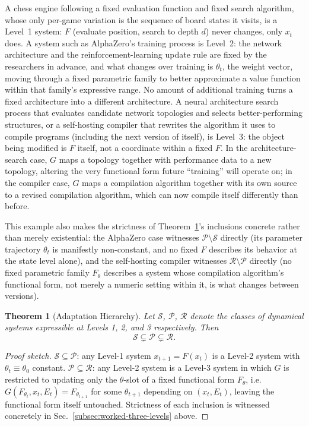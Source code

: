 \documentclass[12pt,a4paper]{article}
\theoremstyle{plain}
\newtheorem{theorem}{Theorem}[section]
\theoremstyle{definition}
\theoremstyle{remark}
\begin{document}
A chess engine following a fixed evaluation function and fixed search algorithm, whose only per-game variation is the sequence of board states it visits, is a Level~1 system: $F$ (evaluate position, search to depth $d$) never changes, only $x_t$ does. A system such as AlphaZero's training process is Level~2: the network architecture and the reinforcement-learning update rule are fixed by the researchers in advance, and what changes over training is $\theta_t$, the weight vector, moving through a fixed parametric family to better approximate a value function within that family's expressive range. No amount of additional training turns a fixed architecture into a different architecture. A neural architecture search process that evaluates candidate network topologies and selects better-performing structures, or a self-hosting compiler that rewrites the algorithm it uses to compile programs (including the next version of itself), is Level~3: the object being modified is $F$ itself, not a coordinate within a fixed $F$. In the architecture-search case, $G$ maps a topology together with performance data to a new topology, altering the very functional form future ``training'' will operate on; in the compiler case, $G$ maps a compilation algorithm together with its own source to a revised compilation algorithm, which can now compile itself differently than before.

This example also makes the strictness of Theorem~\ref{thm:adaptation-hierarchy}'s inclusions concrete rather than merely existential: the AlphaZero case witnesses $\mathcal{P}\setminus\mathcal{S}$ directly (its parameter trajectory $\theta_t$ is manifestly non-constant, and no fixed $F$ describes its behavior at the state level alone), and the self-hosting compiler witnesses $\mathcal{R}\setminus\mathcal{P}$ directly (no fixed parametric family $F_\theta$ describes a system whose compilation algorithm's functional form, not merely a numeric setting within it, is what changes between versions).

\begin{theorem}[Adaptation Hierarchy]
\label{thm:adaptation-hierarchy}
Let $\mathcal{S}$, $\mathcal{P}$, $\mathcal{R}$ denote the classes of dynamical systems expressible at Levels 1, 2, and 3 respectively. Then
\[
\mathcal{S} \subsetneq \mathcal{P} \subsetneq \mathcal{R}.
\]
\end{theorem}

\begin{proof}[Proof sketch]
$\mathcal{S} \subseteq \mathcal{P}$: any Level-1 system $x_{t+1}=F(x_t)$ is a Level-2 system with $\theta_t \equiv \theta_0$ constant. $\mathcal{P} \subseteq \mathcal{R}$: any Level-2 system is a Level-3 system in which $G$ is restricted to updating only the $\theta$-slot of a fixed functional form $F_\theta$, i.e.\ $G(F_{\theta_t}, x_t, E_t) = F_{\theta_{t+1}}$ for some $\theta_{t+1}$ depending on $(x_t, E_t)$, leaving the functional form itself untouched. Strictness of each inclusion is witnessed concretely in Sec.~\ref{subsec:worked-three-levels} above.
\end{proof}
\end{document}

